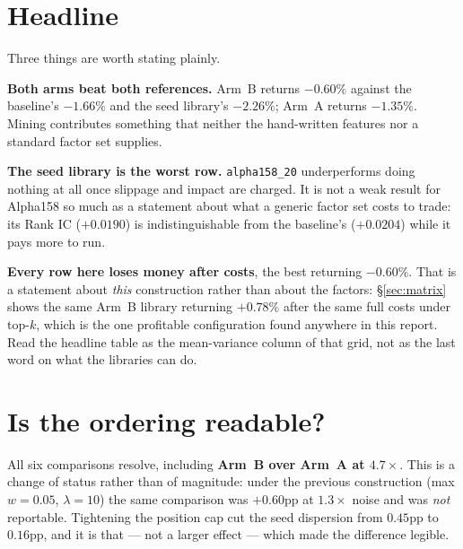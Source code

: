 \documentclass[11pt,a4paper]{article}
\begin{document}
\section{Headline}

\begin{table}[h]\centering
\caption{Full period, mean across combiner seeds $(42,1,7)$. Mined factors only.}
\end{table}

Three things are worth stating plainly.

\textbf{Both arms beat both references.} Arm~B returns $-0.60\%$ against the
baseline's $-1.66\%$ and the seed library's $-2.26\%$; Arm~A returns $-1.35\%$.
Mining contributes something that neither the hand-written features nor a
standard factor set supplies.

\textbf{The seed library is the worst row.} \texttt{alpha158\_20} underperforms
doing nothing at all once slippage and impact are charged. It is not a weak
result for Alpha158 so much as a statement about what a generic factor set costs
to trade: its Rank IC ($+0.0190$) is indistinguishable from the baseline's
($+0.0204$) while it pays more to run.

\textbf{Every row here loses money after costs}, the best returning $-0.60\%$.
That is a statement about \emph{this} construction rather than about the
factors: \S\ref{sec:matrix} shows the same Arm~B library returning $+0.78\%$
after the same full costs under top-$k$, which is the one profitable
configuration found anywhere in this report. Read the headline table as the
mean-variance column of that grid, not as the last word on what the libraries
can do.

\section{Is the ordering readable?}

\begin{table}[h]\centering
\caption{Pairwise net-ARR gaps against the largest combiner-seed standard
deviation in either configuration. A gap under $2\times$ the noise cannot
support a ranking.}
\end{table}

All six comparisons resolve, including \textbf{Arm~B over Arm~A at
$4.7\times$}. This is a change of status rather than of magnitude: under the
previous construction (max $w=0.05$, $\lambda=10$) the same comparison was
$+0.60$pp at $1.3\times$ noise and was \emph{not} reportable. Tightening the
position cap cut the seed dispersion from $0.45$pp to $0.16$pp, and it is that
--- not a larger effect --- which made the difference legible.
\end{document}

